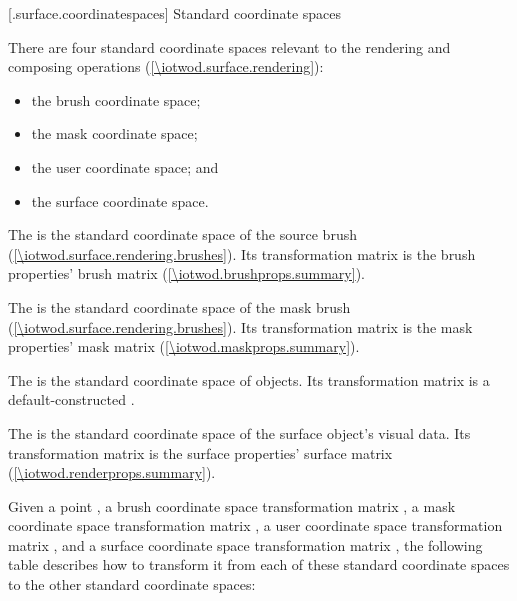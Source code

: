  [\iotwod.surface.coordinatespaces] {Standard coordinate spaces}

\pnum
There are four standard coordinate spaces relevant to the rendering and composing operations (\ref{\iotwod.surface.rendering}):
\begin{itemize}
\item the brush coordinate space;
\item the mask coordinate space;
\item the user coordinate space; and
\item the surface coordinate space.
\end{itemize}

\pnum
The  is the standard coordinate space of the source brush (\ref{\iotwod.surface.rendering.brushes}). Its transformation matrix is the brush properties' brush matrix (\ref{\iotwod.brushprops.summary}).

\pnum
The  is the standard coordinate space of the mask brush (\ref{\iotwod.surface.rendering.brushes}). Its transformation matrix is the mask properties' mask matrix (\ref{\iotwod.maskprops.summary}).

\pnum
The  is the standard coordinate space of  objects. Its transformation matrix is a default-constructed .

\pnum
The  is the standard coordinate space of the surface object's visual data. Its transformation matrix is the surface properties' surface matrix (\ref{\iotwod.renderprops.summary}).

\pnum
Given a point , a brush coordinate space transformation matrix , a mask coordinate space transformation matrix , a user coordinate space transformation matrix , and a surface coordinate space transformation matrix , the following table describes how to transform it from each of these standard coordinate spaces to the other standard coordinate spaces:

